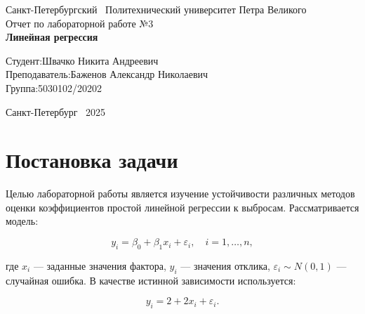 \documentclass[a4paper]{article}
\begin{document}
    \begin{titlepage}
        \Large
        \begin{center}
            Санкт-Петербургский \ Политехнический университет Петра Великого\\
            \vspace{10em}Отчет по лабораторной работе №3\\
            \vspace{2em}
            \textbf{Линейная регрессия}
        \end{center}
        \vspace{6em}
        \hfill\parbox{10cm}{
            \hspace*{2cm}\hspace*{-4cm}Студент:\hfill Швачко Никита Андреевич\\
            \hspace*{2cm}\hspace*{-4cm}Преподаватель:\hfill Баженов Александр Николаевич\\
            \hspace*{2cm}\hspace*{-4cm}Группа:\hfill 5030102/20202
        }
        \vspace{\fill}
        \begin{center}
            Санкт-Петербург \ 2025
        \end{center}
    \end{titlepage}



    \section{Постановка задачи}

    Целью лабораторной работы является изучение устойчивости различных методов оценки коэффициентов простой линейной регрессии к выбросам. Рассматривается модель:

    \begin{equation}
        y_i = \beta_0 + \beta_1 x_i + \varepsilon_i, \quad i=1,\ldots,n,
    \end{equation}

    где $x_i$ — заданные значения фактора, $y_i$ — значения отклика, $\varepsilon_i \sim N(0,1)$ — случайная ошибка. В качестве истинной зависимости используется:

    \begin{equation}
        y_i = 2 + 2x_i + \varepsilon_i.
    \end{equation}
\end{document}
